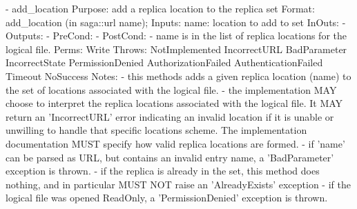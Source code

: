 \begin{myspec}
    - add_location
      Purpose:  add a replica location to the replica set
      Format:   add_location     (in  saga::url name);
      Inputs:   name:             location to add to set
      InOuts:   -
      Outputs:  -
      PreCond:  -
      PostCond: - name is in the list of replica locations for
                  the logical file.
      Perms:    Write
      Throws:   NotImplemented
                IncorrectURL
                BadParameter
                IncorrectState
                PermissionDenied
                AuthorizationFailed
                AuthenticationFailed
                Timeout
                NoSuccess
      Notes:    - this methods adds a given replica location 
                  (name) to the set of locations associated with 
                  the logical file.
                - the implementation MAY choose to interpret the
                  replica locations associated with the logical 
                  file.  It MAY return an 'IncorrectURL' error 
                  indicating an invalid location if it is unable 
                  or unwilling to handle that specific locations
                  scheme.  The implementation documentation MUST 
                  specify how valid replica locations are formed.
                - if 'name' can be parsed as URL, but contains 
                  an invalid entry name, a 'BadParameter'
                  exception is thrown.
                - if the replica is already in the set, this
                  method does nothing, and in particular MUST
                  NOT raise an 'AlreadyExists' exception
                - if the logical file was opened ReadOnly, a
                  'PermissionDenied' exception is thrown.
 

\end{myspec}
